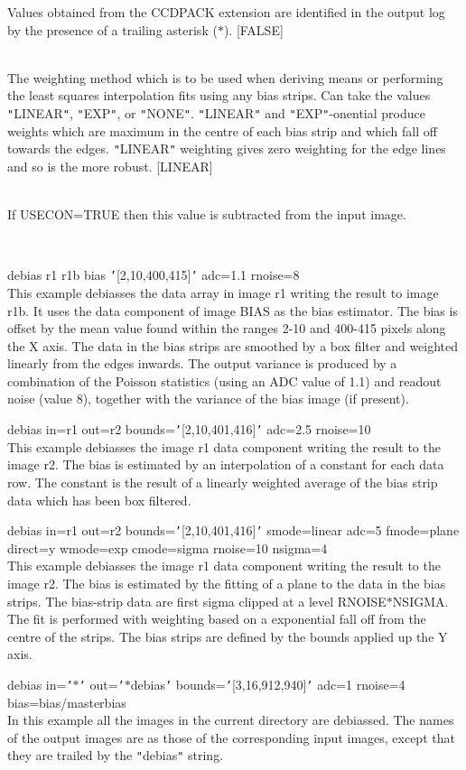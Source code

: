 \documentclass[twoside,11pt]{article}
\renewcommand{\_}{\texttt{\symbol{95}}}
\newcommand{\qt}[1]{{\tt "}#1{\tt "}}
\newcommand{\qs}[1]{{\tt '}#1{\tt '}}
\newcommand{\sstexamples}[1]{
   \item[Examples:] \mbox{} \\
   \vspace{-3.5ex}
   \begin{description}
      #1
   \end{description}
}
\newcommand{\sstsubsection}[1]{ \item[{#1}] \mbox{} \\}
\newcommand{\sstexamplesubsection}[2]{\sloppy \item{\ssttt #1} \mbox{} \\ #2 }
\newcommand{\sstnotes}[1]{\item[Notes:] \mbox{} \\[1.3ex] #1}
\newcommand{\sstitemlist}[1]{
  \mbox{} \\
  \vspace{-3.5ex}
  \begin{itemize}
     #1
  \end{itemize}
}
\newcommand{\sstexamples}[1]{
      \item[Examples:] \\
      \begin{description}
         #1
      \end{description}
      \\
   }
\newcommand{\sstsubsection}[1]{\item[{#1}]}
\newcommand{\sstexamplesubsection}[2]{\item[{\ssttt #1}] #2}
\newcommand{\sstnotes}[1]{\item[Notes:] #1 }
\newcommand{\sstitemlist}[1]{
      \begin{itemize}
         #1
      \end{itemize}
      \\
   }
\begin{document}
{{{         Values obtained from the CCDPACK extension are identified in
         the output log by the presence of a trailing asterisk ($*$).
         [FALSE]
      }
      \sstsubsection{
         WMODE = LITERAL (Read)
      } {
         The weighting method which is to be used when deriving means
         or performing the least squares interpolation fits using any
         bias strips. Can take the values \qt{LINEAR}, \qt{EXP}, or \qt{NONE}.
         \qt{LINEAR} and \qt{EXP}-onential produce weights which are maximum
         in the centre of each bias strip and which fall off towards
         the edges. \qt{LINEAR} weighting gives zero weighting for the
         edge lines and so is the more robust.
         [LINEAR]
      }
      \sstsubsection{
         ZERO = \_DOUBLE (Read)
      } {
         If USECON=TRUE then this value is subtracted from the input
         image.
      }
   }
\newpage
   \sstexamples{
      \sstexamplesubsection{
         debias r1 r1b bias \qs{[2,10,400,415]} adc=1.1 rnoise=8
      } {
         This example debiasses the data array in image r1 writing the
         result to image r1b. It uses the data component of image BIAS as
         the bias estimator. The bias is offset by the mean value found
         within the ranges 2-10 and 400-415 pixels along the X axis.
         The data in the bias strips are smoothed by a box filter and
         weighted linearly from the edges inwards. The output variance
         is produced by a combination of the Poisson statistics (using
         an ADC value of 1.1) and readout noise (value 8), together
         with the variance of the bias image (if present).
      }
      \sstexamplesubsection{
         debias in=r1 out=r2 bounds=\qs{[2,10,401,416]} adc=2.5 rnoise=10
      } {
         This example debiasses the image r1 data component writing the
         result to the image r2. The bias is estimated by an interpolation
         of a constant for each data row. The constant is the result of
         a linearly weighted average of the bias strip data which has
         been box filtered.
      }
      \sstexamplesubsection{
         debias in=r1 out=r2 bounds=\qs{[2,10,401,416]} smode=linear adc=5
             fmode=plane direct=y wmode=exp cmode=sigma rnoise=10
             nsigma=4
      } {
         This example debiasses the image r1 data component writing the
         result to the image r2. The bias is estimated by the fitting of a
         plane to the data in the bias strips. The bias-strip data are
         first sigma clipped at a level RNOISE$*$NSIGMA. The fit is
         performed with weighting based on a exponential fall off
         from the centre of the strips. The bias strips are defined by
         the bounds applied up the Y axis.
      }
      \sstexamplesubsection{
         debias in=\qs{$*$} out=\qs{$*$\_debias}
             bounds=\qs{[3,16,912,940]} adc=1 rnoise=4
             bias=bias/master\_bias
      } {
         In this example all the images in the current directory are
         debiassed. The names of the output images are as those of the
         corresponding input images, except that they are trailed by the
         \qt{\_debias} string.
      }
   }
   \sstnotes{
      \sstitemlist{

}}}
\end{document}
